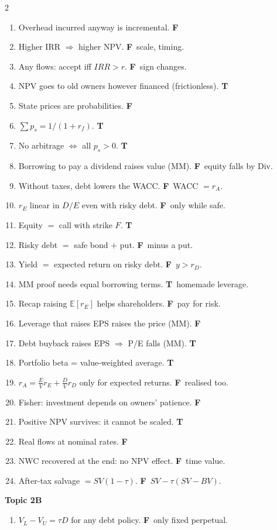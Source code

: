 \documentclass[8pt,a4paper]{extarticle}
\newcommand{\T}{\textbf{\color{ok}T}~}
\newcommand{\F}{\textbf{\color{wr}F}~}
\newcommand{\E}{\mathbb{E}}
\begin{document}
\begin{multicols}{2}
\begin{enumerate}[label=\arabic*.,start=19,leftmargin=1.6em,itemsep=0pt]
  \item Overhead incurred anyway is incremental. \F
  \item Higher IRR $\Rightarrow$ higher NPV. \F{}scale, timing.
  \item Any flows: accept iff $IRR>r$. \F{}sign changes.
  \item NPV goes to old owners however financed (frictionless). \T
  \item State prices are probabilities. \F
  \item $\sum p_s=1/(1+r_f)$. \T
  \item No arbitrage $\Leftrightarrow$ all $p_s>0$. \T
  \item Borrowing to pay a dividend raises value (MM). \F{}equity falls by Div.
  \item Without taxes, debt lowers the WACC. \F{}WACC $=r_A$.
  \item $r_E$ linear in $D/E$ even with risky debt. \F{}only while safe.
  \item Equity $=$ call with strike $F$. \T
  \item Risky debt $=$ safe bond $+$ put. \F{}minus a put.
  \item Yield $=$ expected return on risky debt. \F$y>r_D$.
  \item MM proof needs equal borrowing terms. \T{}homemade leverage.
  \item Recap raising $\E[r_E]$ helps shareholders. \F{}pay for risk.
  \item Leverage that raises EPS raises the price (MM). \F
  \item Debt buyback raises EPS $\Rightarrow$ P/E falls (MM). \T
  \item Portfolio beta = value-weighted average. \T
  \item $r_A=\frac EVr_E+\frac DVr_D$ only for expected returns. \F{}realised too.
  \item Fisher: investment depends on owners' patience. \F
  \item Positive NPV survives: it cannot be scaled. \T
  \item Real flows at nominal rates. \F
  \item NWC recovered at the end: no NPV effect. \F{}time value.
  \item After-tax salvage $=SV(1-\tau)$. \F$SV-\tau(SV-BV)$.
\end{enumerate}
\textbf{\color{hd}Topic 2B}
\begin{enumerate}[label=\arabic*.,start=48,leftmargin=1.6em,itemsep=0pt]
  \item $V_L-V_U=\tau D$ for any debt policy. \F{}only fixed perpetual.

\end{enumerate}
\end{multicols}
\end{document}
